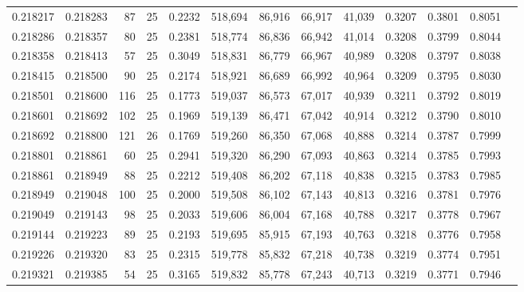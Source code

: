 \begin{tabular}{rrrrrrrrrrrrr}
0.218217 & 0.218283 &    87 &  25 &                                     0.2232 & 518,694 &  86,916 &  66,917 &  41,039 & 0.3207 & 0.3801 & 0.8051 \\
0.218286 & 0.218357 &    80 &  25 &                                     0.2381 & 518,774 &  86,836 &  66,942 &  41,014 & 0.3208 & 0.3799 & 0.8044 \\
0.218358 & 0.218413 &    57 &  25 &                                     0.3049 & 518,831 &  86,779 &  66,967 &  40,989 & 0.3208 & 0.3797 & 0.8038 \\
0.218415 & 0.218500 &    90 &  25 &                                     0.2174 & 518,921 &  86,689 &  66,992 &  40,964 & 0.3209 & 0.3795 & 0.8030 \\
0.218501 & 0.218600 &   116 &  25 &                                     0.1773 & 519,037 &  86,573 &  67,017 &  40,939 & 0.3211 & 0.3792 & 0.8019 \\
0.218601 & 0.218692 &   102 &  25 &                                     0.1969 & 519,139 &  86,471 &  67,042 &  40,914 & 0.3212 & 0.3790 & 0.8010 \\
0.218692 & 0.218800 &   121 &  26 &                                     0.1769 & 519,260 &  86,350 &  67,068 &  40,888 & 0.3214 & 0.3787 & 0.7999 \\
0.218801 & 0.218861 &    60 &  25 &                                     0.2941 & 519,320 &  86,290 &  67,093 &  40,863 & 0.3214 & 0.3785 & 0.7993 \\
0.218861 & 0.218949 &    88 &  25 &                                     0.2212 & 519,408 &  86,202 &  67,118 &  40,838 & 0.3215 & 0.3783 & 0.7985 \\
0.218949 & 0.219048 &   100 &  25 &                                     0.2000 & 519,508 &  86,102 &  67,143 &  40,813 & 0.3216 & 0.3781 & 0.7976 \\
0.219049 & 0.219143 &    98 &  25 &                                     0.2033 & 519,606 &  86,004 &  67,168 &  40,788 & 0.3217 & 0.3778 & 0.7967 \\
0.219144 & 0.219223 &    89 &  25 &                                     0.2193 & 519,695 &  85,915 &  67,193 &  40,763 & 0.3218 & 0.3776 & 0.7958 \\
0.219226 & 0.219320 &    83 &  25 &                                     0.2315 & 519,778 &  85,832 &  67,218 &  40,738 & 0.3219 & 0.3774 & 0.7951 \\
0.219321 & 0.219385 &    54 &  25 &                                     0.3165 & 519,832 &  85,778 &  67,243 &  40,713 & 0.3219 & 0.3771 & 0.7946 \\

\end{tabular}
